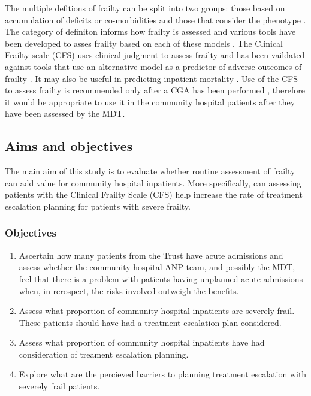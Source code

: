 \documentclass[12pt,a4paper,oneside,titlepage]{article}
\begin{document}
The multiple defitions of frailty can be split into two groups: those based on accumulation 
of deficits or co-morbidities and those that consider the phenotype \parencite{shamliyan:13}. 
The category of definiton informs how frailty is assessed and various tools have been developed
to asses frailty based on each of these models \parencite{clegg:13}.
The Clinical Frailty scale (CFS) \parencite{dalhousie:15} uses clinical judgment 
to assess frailty and has been vaildated
against tools that use an alternative model as a predictor of adverse outcomes 
of frailty \parencite{rockwood:05}. It may also be useful in predicting
inpatient mortality \parencite{wallis:15}.
Use of the CFS to
assess frailty is recommended only after a CGA has been performed \parencite{bgs:14}, therefore
it would be appropriate to use it in the community hospital patients after they
have been assessed by the MDT.

\subsection*{Aims and objectives}
The main aim of this study is to evaluate whether routine assessment of
frailty can add value for community hospital inpatients.
More specifically, can assessing patients with the Clinical Frailty Scale (CFS)
help increase the rate of 
treatment escalation planning for patients with severe frailty. 

\subsubsection*{Objectives}
\begin{enumerate}
\item Ascertain how many patients from the Trust have acute admissions and assess 
	whether the community hospital ANP team, and possibly the MDT, 
	feel that there is a  problem with patients 
	having unplanned acute admissions when, in rerospect, the risks involved
	outweigh the benefits.
\item Assess what proportion of community hospital inpatients are severely frail.
	These patients should have had a treatment escalation plan considered.
\item Assess what proportion of community hospital inpatients have had consideration
	of treament escalation planning.
\item Explore what are the percieved barriers to planning treatment escalation
	with severely frail patients.


\end{enumerate}
\end{document}
